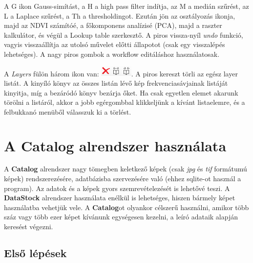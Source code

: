 \documentclass[a4paper,12pt]{article}
\begin{document}
A G ikon Gauss-simítást, a H a high pass filter indítja, az M a medián szűrést, az L a Laplace szűrést, a Th a thresholdingot. Ezután jön az osztályozás ikonja, majd az NDVI számítóé, a főkomponens analízisé (PCA), majd a raszter kalkulátor, és végül a Lookup table szerkesztő. A piros vissza-nyíl \textit{undo} funkció, vagyis visszaállítja az utolsó művelet előtti állapotot (csak egy visszalépés lehetséges). A nagy piros gombok a workflow editáláshoz használatosak.

A \textit{Layers} fülön három ikon van: \includegraphics[height=0.55cm]{layer_list_icons.png}. A piros kereszt törli az egész layer listát. A kinyíló könyv az összes listán lévő kép frekvenciasávjainak listáját kinyitja, míg a bezáródó könyv bezárja őket. Ha csak egyetlen elemet akarunk törölni a listáról, akkor a jobb egérgombbal klikkeljünk a kívánt listaelemre, és a felbukkanó menüből válasszuk ki a törlést.



\section{A Catalog alrendszer használata}

A \textbf{Catalog} alrendszer nagy tömegben keletkező képek (csak \textit{jpg} és \textit{tif} formátumú képek) rendszerezésére, adatbázisba szervezésére való (ehhez sqlite-ot használ a program). Az adatok és a képek gyors szemrevételezését is lehetővé teszi. A \textbf{DataStock} alrendszer használata enélkül is lehetséges, hiszen bármely képet használatba vehetjük vele. A \textbf{Catalog}ot olyankor célszerű használni, amikor több száz vagy több ezer képet kívánunk egységesen kezelni, a leíró adataik alapján keresést végezni.

\subsection{Első lépések}
\end{document}
